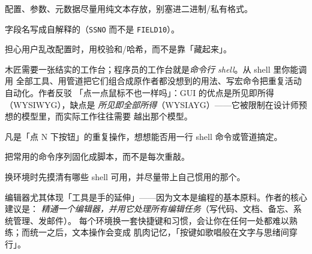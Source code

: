 \begin{actions}
\item 配置、参数、元数据尽量用纯文本存放，别塞进二进制/私有格式。
\item 字段名写成自解释的（\texttt{SSNO} 而不是 \texttt{FIELD10}）。
\item 担心用户乱改配置时，用校验和/哈希，而不是靠「藏起来」。
\end{actions}


\begin{ideabox}
木匠需要一张结实的工作台；程序员的工作台就是\emph{命令行 shell}。从 shell 里你能调用
全部工具、用管道把它们组合成原作者都没想到的用法、写宏命令把重复活动自动化。作者反驳
「点一点鼠标不也一样吗」：GUI 的优点是所见即所得（WYSIWYG），缺点是
\emph{所见即全部所得}（WYSIAYG）——它被限制在设计师预想的模型里，而实际工作往往需要
越出那个模型。
\end{ideabox}

\begin{bitext}
\end{bitext}


\begin{actions}
\item 凡是「点 N 下按钮」的重复操作，想想能否用一行 shell 命令或管道搞定。
\item 把常用的命令序列固化成脚本，而不是每次重敲。
\item 换环境时先摸清有哪些 shell 可用，并尽量带上自己惯用的那个。
\end{actions}


\begin{ideabox}
编辑器尤其体现「工具是手的延伸」——因为文本是编程的基本原料。作者的核心建议是：
\emph{精通一个编辑器，并用它处理所有编辑任务}（写代码、文档、备忘、系统管理、发邮件）。
每个环境换一套快捷键和习惯，会让你在任何一处都难以熟练；而统一之后，文本操作会变成
肌肉记忆，「按键如歌唱般在文字与思绪间穿行」。
\end{ideabox}

